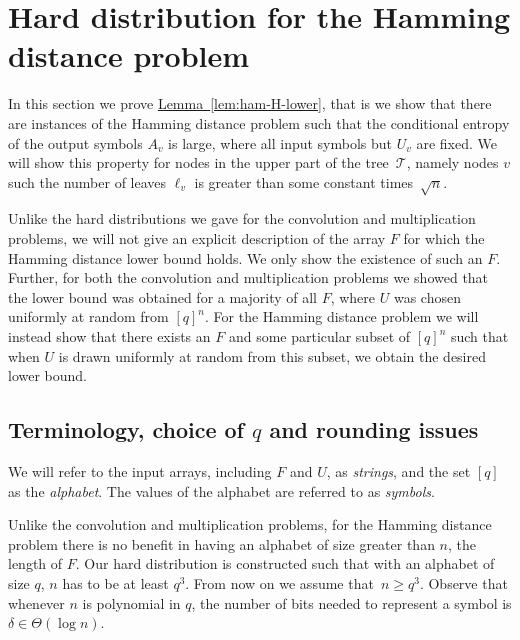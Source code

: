 \documentclass[11pt]{article}
\numberwithin{equation}{section}
\theoremstyle{definition}
\theoremstyle{plain}
\newcommand{\expref}[2]{\hyperref[#2]{#1~\ref{#2}}}
\newcommand{\calT}{\ensuremath{\mathcal{T}}}
\newcommand{\Xv}{\ensuremath{U_v}}
\newcommand{\Yv}{\ensuremath{A_v}}
\begin{document}
%
%
%
%
%
%
%
%
%
%



%



%




\section{Hard distribution for the Hamming distance problem} \label{sec:ham}

In this section we prove \expref{Lemma}{lem:ham-H-lower}, that is we show that there are instances of the Hamming distance problem such that the conditional entropy of the output symbols $\Yv$ is large, where all input symbols but $\Xv$ are fixed.
We will show this property for nodes in the upper part of the tree~$\calT$, namely nodes $v$ such the number of leaves $\ell_v$ is greater than some constant times~$\sqrt{n}$. 

Unlike the hard distributions we gave for the convolution and multiplication problems, we will not give an explicit description of the array $F$ for which the Hamming distance lower bound holds. We only show the existence of such an $F$.
Further, for both the convolution and multiplication problems we showed that the lower bound was obtained for a majority of all $F$, where $U$ was chosen uniformly at random from $[q]^n$.
For the Hamming distance problem we will instead show that there exists an $F$ and some particular subset of $[q]^n$ such that when $U$ is drawn uniformly at random from this subset, we obtain the desired lower bound.

\subsection{Terminology, choice of \texorpdfstring{$q$}{q} and rounding issues} \label{sec:rounding}

We will refer to the input arrays, including $F$ and $U$, as \emph{strings}, and the set $[q]$ as the \emph{alphabet}. The values of the alphabet are referred to as \emph{symbols}.

Unlike the convolution and multiplication problems, for the Hamming distance problem there is no benefit in having an alphabet
of    %
size greater
than  %
$n$, the length of $F$.
Our hard distribution is constructed such that with an alphabet of size $q$, $n$ has to be at least $q^3$.
{}From now on we assume that~$n\geq q^3$.
Observe that whenever $n$ is polynomial in $q$, the number of bits needed to represent a symbol is $\delta\in\Theta(\log n)$.
\end{document}
